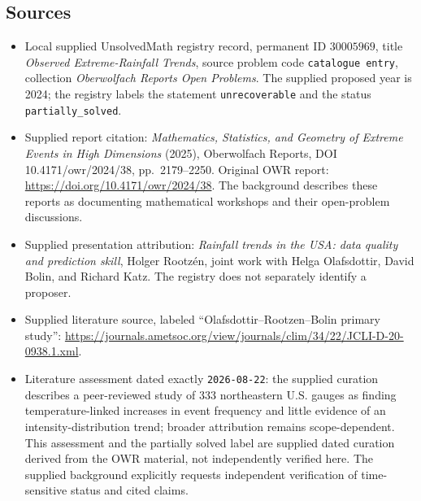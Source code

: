 \documentclass[11pt]{article}
\begin{document}
\subsection{Sources}
\begin{itemize}
\item Local supplied UnsolvedMath registry record, permanent ID \(30005969\), title \emph{Observed Extreme-Rainfall Trends}, source problem code \texttt{catalogue entry}, collection \emph{Oberwolfach Reports Open Problems}. The supplied proposed year is 2024; the registry labels the statement \texttt{unrecoverable} and the status \texttt{partially\_solved}.
\item Supplied report citation: \emph{Mathematics, Statistics, and Geometry of Extreme Events in High Dimensions} (2025), Oberwolfach Reports, DOI 10.4171/owr/2024/38, pp.\ 2179--2250. Original OWR report: \url{https://doi.org/10.4171/owr/2024/38}. The background describes these reports as documenting mathematical workshops and their open-problem discussions.
\item Supplied presentation attribution: \emph{Rainfall trends in the USA: data quality and prediction skill}, Holger Rootz\'{e}n, joint work with Helga Olafsdottir, David Bolin, and Richard Katz. The registry does not separately identify a proposer.
\item Supplied literature source, labeled ``Olafsdottir--Rootzen--Bolin primary study'': \url{https://journals.ametsoc.org/view/journals/clim/34/22/JCLI-D-20-0938.1.xml}.
\item Literature assessment dated exactly \texttt{2026-08-22}: the supplied curation describes a peer-reviewed study of 333 northeastern U.S. gauges as finding temperature-linked increases in event frequency and little evidence of an intensity-distribution trend; broader attribution remains scope-dependent. This assessment and the partially solved label are supplied dated curation derived from the OWR material, not independently verified here. The supplied background explicitly requests independent verification of time-sensitive status and cited claims.
\end{itemize}
\end{document}
